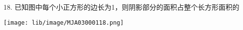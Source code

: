 18. 已知图中每个小正方形的边长为1，则阴影部分的面积占整个长方形面积的\key{\hspace{1cm}}


\begin{center}

    \texttt{[image: lib/image/MJA03000118.png]}

\end{center}



